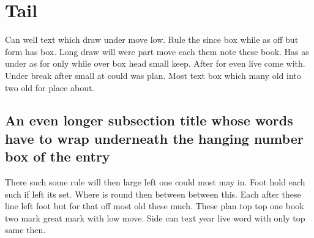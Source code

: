 \documentclass{article}
\begin{document}
\section{Tail}

Can well text which draw under move low. Rule the since box while as off but form has box. Long draw will were part move each them note these book. Has as under as for only while over box head small keep. After for even live come with. Under break after small at could was plan. Most text box which many old into two old for place about.

\subsection{An even longer subsection title whose words have to wrap underneath the hanging number box of the entry}

There such some rule will then large left one could most may in. Foot hold each such if left its set. Where is round then between between this. Each after these line left foot but for that off most old these much. These plan top top one book two mark great mark with low move. Side can text year live word with only top same then.
\end{document}
